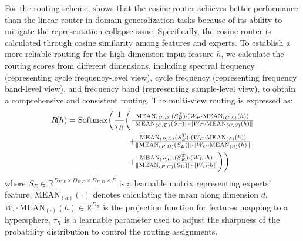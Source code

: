 \documentclass{article}
\begin{document}
	For the routing scheme, \cite{RN7} shows that the cosine router achieves better performance than the linear router in domain generalization tasks because of its ability to mitigate the representation collapse issue. Specifically, the cosine router is calculated through cosine similarity among features and experts. To establish a more reliable routing for the high-dimension input feature $h$, we calculate the routing scores from different dimensions, including spectral frequency (representing cycle frequency-level view), cycle frequency (representing frequency band-level view), and frequency band (representing sample-level view), to obtain a comprehensive and consistent routing. The multi-view routing is expressed as:
	\begin{equation}
		\setlength{\thinmuskip}{-3mu}
		\setlength{\medmuskip}{-3mu}
		\begin{split}
			R\left(h\right) = \mathrm{Softmax}\biggl( \frac{1}{\tau_{R}} \biggl(
			& \tfrac{ \mathrm{MEAN}_{(C,D)}(S_{E}^{T}) \cdot (W_{P} \cdot \mathrm{MEAN}_{(C,S)}(h)) }{ \|\mathrm{MEAN}_{(C,D)}(S_{E})\| \cdot \|W_{P} \cdot \mathrm{MEAN}_{(C,S)}(h)\| } \\
			& + \tfrac{ \mathrm{MEAN}_{(P,D)}(S_{E}^{T}) \cdot (W_{C} \cdot \mathrm{MEAN}_{(S)}(h)) }{ \|\mathrm{MEAN}_{(P,D)}(S_{E})\| \cdot \|W_{C} \cdot \mathrm{MEAN}_{(S)}(h)\| } \\
			& + \tfrac{ \mathrm{MEAN}_{(P,C)}(S_{E}^{T}) \cdot (W_{D} \cdot h) }{ \|\mathrm{MEAN}_{(P,C)}(S_{E})\| \cdot \|W_{D} \cdot h\| }
			\biggr) \biggr)
		\end{split}
	\end{equation}
	where $S_{E}\in\mathbb{R}^{D_{E,P}\times D_{E,C}\times D_{E,D}\times E}$ is a learnable matrix representing experts' feature, $\mathrm{MEAN}_{(d)}(\cdot)$ denotes calculating the mean along dimension $d$, $W_{\cdot}\cdot\mathrm{MEAN}_{(\cdot)}(h)\in\mathbb{R}^{D_{E}}$ is the projection function for features mapping to a hypersphere, $\tau_{R}$ is a learnable parameter used to adjust the sharpness of the probability distribution to control the routing assignments.
	
\end{document}

